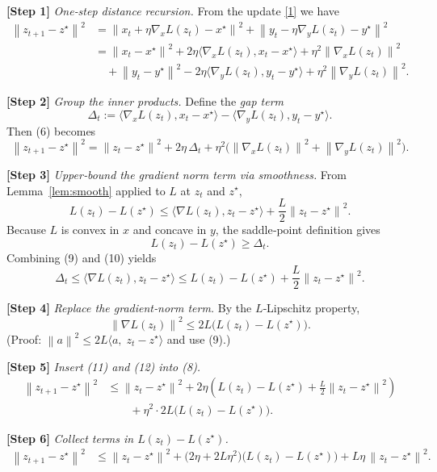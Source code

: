 \documentclass{article}
\newcommand{\norm}[1]{\left\lVert#1\right\rVert}
\begin{document}
\bigskip
\noindent\textbf{[Step 1]} \emph{One‑step distance recursion.}  
From the update \eqref{1} we have
\[
\begin{aligned}
\norm{z_{t+1}-z^\star}^2
&=\norm{x_t+\eta\nabla_x L(z_t)-x^\star}^2
   +\norm{y_t-\eta\nabla_y L(z_t)-y^\star}^2\\
&=\norm{x_t-x^\star}^2+2\eta\langle\nabla_x L(z_t),x_t-x^\star\rangle
   +\eta^2\norm{\nabla_x L(z_t)}^2\\
&\quad+\norm{y_t-y^\star}^2-2\eta\langle\nabla_y L(z_t),y_t-y^\star\rangle
   +\eta^2\norm{\nabla_y L(z_t)}^2 .
\end{aligned}
\tag{6}
\]

\noindent\textbf{[Step 2]} \emph{Group the inner products.}  
Define the \emph{gap term}
\[
\Delta_t:=\langle\nabla_x L(z_t),x_t-x^\star\rangle
         -\langle\nabla_y L(z_t),y_t-y^\star\rangle .
\tag{7}
\]
Then (6) becomes
\[
\norm{z_{t+1}-z^\star}^2
=\norm{z_t-z^\star}^2+2\eta\,\Delta_t
   +\eta^2\bigl(\norm{\nabla_x L(z_t)}^2+\norm{\nabla_y L(z_t)}^2\bigr).
\tag{8}
\]

\noindent\textbf{[Step 3]} \emph{Upper‑bound the gradient norm term via smoothness.}  
From Lemma~\ref{lem:smooth} applied to $L$ at $z_t$ and $z^\star$,
\[
L(z_t)-L(z^\star)\le \langle\nabla L(z_t),z_t-z^\star\rangle
                    +\frac{L}{2}\norm{z_t-z^\star}^2 .
\tag{9}
\]
Because $L$ is convex in $x$ and concave in $y$, the saddle‑point definition gives
\[
L(z_t)-L(z^\star)\ge \Delta_t .
\tag{10}
\]
Combining (9) and (10) yields
\[
\Delta_t\le \langle\nabla L(z_t),z_t-z^\star\rangle
           \le L(z_t)-L(z^\star)+\frac{L}{2}\norm{z_t-z^\star}^2 .
\tag{11}
\]

\noindent\textbf{[Step 4]} \emph{Replace the gradient‑norm term.}  
By the $L$‑Lipschitz property,
\[
\norm{\nabla L(z_t)}^2
\le 2L\bigl(L(z_t)-L(z^\star)\bigr) .
\tag{12}
\]
(Proof: $\norm{a}^2\le 2L\bigl\langle a,\;z_t-z^\star\big\rangle$ and use (9).)

\noindent\textbf{[Step 5]} \emph{Insert (11) and (12) into (8).}  
\[
\begin{aligned}
\norm{z_{t+1}-z^\star}^2
&\le \norm{z_t-z^\star}^2
   +2\eta\!\left(L(z_t)-L(z^\star)+\frac{L}{2}\norm{z_t-z^\star}^2\right)\\
&\qquad+\eta^2\cdot 2L\bigl(L(z_t)-L(z^\star)\bigr) .
\end{aligned}
\tag{13}
\]

\noindent\textbf{[Step 6]} \emph{Collect terms in $L(z_t)-L(z^\star)$.}  
\[
\begin{aligned}
\norm{z_{t+1}-z^\star}^2
&\le \norm{z_t-z^\star}^2
   +\bigl(2\eta+2L\eta^2\bigr)\bigl(L(z_t)-L(z^\star)\bigr)
   +L\eta\,\norm{z_t-z^\star}^2 .
\end{aligned}
\tag{14}
\]
\end{document}
